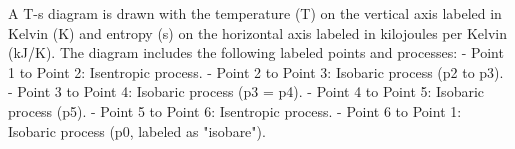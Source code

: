 A T-s diagram is drawn with the temperature (T) on the vertical axis labeled in Kelvin (K) and entropy (s) on the horizontal axis labeled in kilojoules per Kelvin (kJ/K). The diagram includes the following labeled points and processes:  
- Point 1 to Point 2: Isentropic process.  
- Point 2 to Point 3: Isobaric process (p2 to p3).  
- Point 3 to Point 4: Isobaric process (p3 = p4).  
- Point 4 to Point 5: Isobaric process (p5).  
- Point 5 to Point 6: Isentropic process.  
- Point 6 to Point 1: Isobaric process (p0, labeled as "isobare").